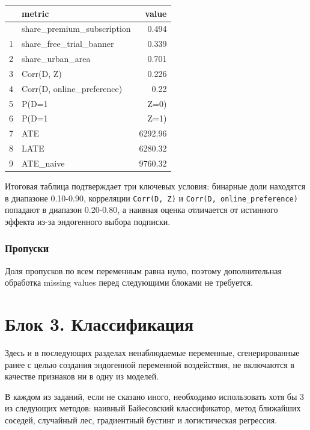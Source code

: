 \documentclass[11pt]{article}
\newcounter{none}
\begin{document}
{\def\LTcaptype{none} %
\begin{longtable}[]{@{}rlr@{}}
\toprule\noalign{}
& metric & value \\
\midrule\noalign{}
\endhead
\bottomrule\noalign{}
\endlastfoot
0 & share\_premium\_subscription & 0.494 \\
1 & share\_free\_trial\_banner & 0.339 \\
2 & share\_urban\_area & 0.701 \\
3 & Corr(D, Z) & 0.226 \\
4 & Corr(D, online\_preference) & 0.22 \\
5 & P(D=1 & Z=0) \\
6 & P(D=1 & Z=1) \\
7 & ATE & 6292.96 \\
8 & LATE & 6280.32 \\
9 & ATE\_naive & 9760.32 \\
\end{longtable}
}

Итоговая таблица подтверждает три ключевых условия: бинарные доли
находятся в диапазоне 0.10-0.90, корреляции \texttt{Corr(D,\ Z)} и
\texttt{Corr(D,\ online\_preference)} попадают в диапазон 0.20-0.80, а
наивная оценка отличается от истинного эффекта из-за эндогенного выбора
подписки.

\subsubsection{Пропуски}\label{ux43fux440ux43eux43fux443ux441ux43aux438}

Доля пропусков по всем переменным равна нулю, поэтому дополнительная
обработка missing values перед следующими блоками не требуется.

    \section{Блок 3.
Классификация}\label{ux431ux43bux43eux43a-3.-ux43aux43bux430ux441ux441ux438ux444ux438ux43aux430ux446ux438ux44f}

Здесь и в последующих разделах ненаблюдаемые переменные, сгенерированные
ранее с целью создания эндогенной переменной воздействия, не включаются
в качестве признаков ни в одну из моделей.

В каждом из заданий, если не сказано иного, необходимо использовать хотя
бы 3 из следующих методов: наивный Байесовский классификатор, метод
ближайших соседей, случайный лес, градиентный бустинг и логистическая
регрессия.
\end{document}

